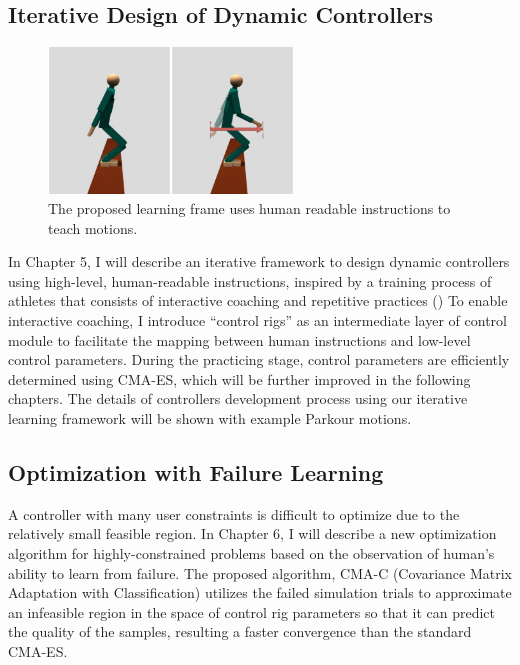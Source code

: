 \subsection{Iterative Design of Dynamic Controllers}
\begin{figure}
 \vspace{-10pt}
  \begin{center}
    \includegraphics[width=0.58\textwidth]{images/intro_teach.png}
  \end{center}
   \vspace{-25pt}
  \caption{The proposed learning frame uses human readable instructions
    to teach motions.}
  \label{fig:intro_teach}
   \vspace{-10pt}
\end{figure}
In Chapter 5, I will describe an iterative framework to design dynamic
controllers using high-level, human-readable instructions,
inspired by a training process of athletes that consists of
interactive coaching and repetitive practices ()
To enable interactive coaching, I introduce ``control rigs'' as
an intermediate layer of control module to facilitate the mapping between
human instructions and low-level control parameters.
During the practicing stage, control parameters are efficiently determined
using CMA-ES, which will be further improved in the following chapters.
The details of controllers development process using our iterative learning
framework will be shown with example Parkour motions.

\subsection{Optimization with Failure Learning}
A controller with many user constraints is difficult to optimize due to the
relatively small feasible region.
In Chapter 6, I will describe a new optimization algorithm for
highly-constrained problems based on the observation of human’s ability 
to learn from failure.
The proposed algorithm, CMA-C (Covariance Matrix Adaptation with
Classification) utilizes the failed simulation trials to approximate 
an infeasible region in the space of control rig parameters 
so that it can predict the quality of the samples,
resulting a faster convergence than the standard CMA-ES.

